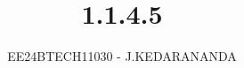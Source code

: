 \documentclass[journal]{IEEEtran}
\begin{document}

\vspace{3cm}

\title{1.1.4.5}
\author{EE24BTECH11030 - J.KEDARANANDA
}
{\let\newpage\relax\maketitle}

\renewcommand{\thefigure}{\theenumi}
\renewcommand{\thetable}{\theenumi}
\setlength{\intextsep}{10pt} %


\renewcommand{\thetable}{\theenumi}
\end{document}
